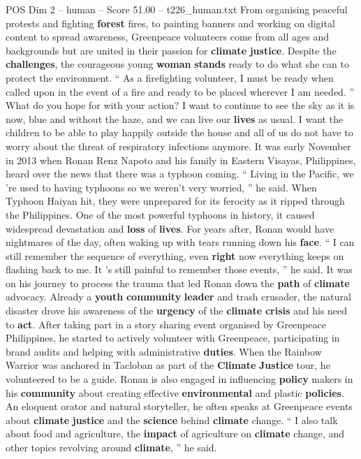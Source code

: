 \begin{textsample}{POS Dim 2 – human – Score 51.00 – t226\_human.txt}  \label{ex:f2_pos_028}
From organising peaceful protests and fighting \textbf{forest} fires, to painting banners and working on digital content to spread awareness, Greenpeace volunteers come from all ages and backgrounds but are united in their passion for \textbf{climate} \textbf{justice}.
Despite the \textbf{challenges}, the courageous young \textbf{woman} \textbf{stands} ready to do what she can to protect the environment. “ As a firefighting volunteer, I must be ready when called upon in the event of a fire and ready to be placed wherever I am needed. ” What do you hope for with your action?
I want to continue to see the sky as it is now, blue and without the haze, and we can live our \textbf{lives} as usual.
I want the children to be able to play happily outside the house and all of us do not have to worry about the threat of respiratory infections anymore.
It was early November in 2013 when Ronan Renz Napoto and his family in Eastern Visayas, Philippines, heard over the news that there was a typhoon coming. “ Living in the Pacific, we ’re used to having typhoons so we weren't very worried, ” he said.
When Typhoon Haiyan hit, they were unprepared for its ferocity as it ripped through the Philippines.
One of the most powerful typhoons in history, it caused widespread devastation and \textbf{loss} of \textbf{lives}.
For years after, Ronan would have nightmares of the day, often waking up with tears running down his \textbf{face}. “ I can still remember the sequence of everything, even \textbf{right} now everything keeps on flashing back to me.
It ’s still painful to remember those events, ” he said.
It was on his journey to process the trauma that led Ronan down the \textbf{path} of \textbf{climate} advocacy.
Already a \textbf{youth} \textbf{community} \textbf{leader} and trash crusader, the natural disaster drove his awareness of the \textbf{urgency} of the \textbf{climate} \textbf{crisis} and his need to \textbf{act}.
After taking part in a story sharing event organised by Greenpeace Philippines, he started to actively volunteer with Greenpeace, participating in brand audits and helping with administrative \textbf{duties}.
When the Rainbow Warrior was anchored in Tacloban as part of the \textbf{Climate} \textbf{Justice} tour, he volunteered to be a guide.
Ronan is also engaged in influencing \textbf{policy} makers in his \textbf{community} about creating effective \textbf{environmental} and plastic \textbf{policies}.
An eloquent orator and natural storyteller, he often speaks at Greenpeace events about \textbf{climate} \textbf{justice} and the \textbf{science} behind \textbf{climate} change. “ I also talk about food and agriculture, the \textbf{impact} of agriculture on \textbf{climate} change, and other topics revolving around \textbf{climate}, ” he said.

\end{textsample}
